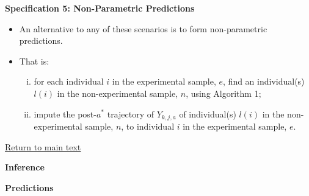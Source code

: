 \documentclass[static]{JJH-Beamer}
\begin{document}
\begin{frame}
 \addtocounter{framenumber}{-1}

\textbf{Specification 5: Non-Parametric Predictions}

\begin{itemize}
\item An alternative to any of these scenarios is to form non-parametric predictions.
\item That is:
    \begin{enumerate}[(i)]
    \item for each individual $i$ in the experimental sample, $e$, find an individual(s) $l(i)$ in the non-experimental sample, $n$, using Algorithm 1;
    \item impute the post-$a^*$ trajectory of $Y_{k,j,a}$ of individual(s) $l(i)$ in the non-experimental sample, $n$, to individual $i$ in the experimental sample, $e$.
    \end{enumerate}
\end{itemize}

\end{frame}

\begin{frame}
 \addtocounter{framenumber}{-1}

\begin{center}
\hyperlink{ret:candycane}{\underline{Return to main text}}
\end{center}

\end{frame}

\begin{frame}
 \addtocounter{framenumber}{-1}

\hypertarget{fruitypebbles}{}
\begin{center}
\textbf{Inference}\label{appendix:bootstrap}
\end{center}

\end{frame}

\begin{frame}
 \addtocounter{framenumber}{-1}

\begin{center}
\textbf{Predictions}\label{appendix:bootstrapspreds}
\end{center}

\end{frame}
\end{document}
